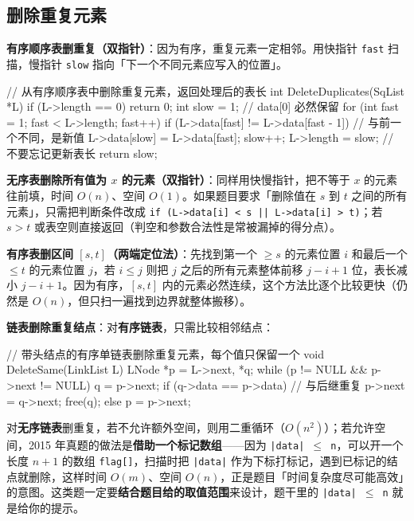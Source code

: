 \documentclass[11pt,openany,UTF8]{ctexbook}
\begin{document}
\subsection{删除重复元素}

\textbf{有序顺序表删重复（双指针）}：因为有序，重复元素一定相邻。用快指针 \texttt{fast} 扫描，慢指针 \texttt{slow} 指向「下一个不同元素应写入的位置」。

\begin{codebox}
// 从有序顺序表中删除重复元素，返回处理后的表长
int DeleteDuplicates(SqList *L) {
    if (L->length == 0) return 0;
    int slow = 1;                            // data[0] 必然保留
    for (int fast = 1; fast < L->length; fast++) {
        if (L->data[fast] != L->data[fast - 1]) {  // 与前一个不同，是新值
            L->data[slow] = L->data[fast];
            slow++;
        }
    }
    L->length = slow;                        // 不要忘记更新表长
    return slow;
}
\end{codebox}

\textbf{无序表删除所有值为 $x$ 的元素（双指针）}：同样用快慢指针，把不等于 $x$ 的元素往前填，时间 $O(n)$、空间 $O(1)$。如果题目要求「删除值在 $s$ 到 $t$ 之间的所有元素」，只需把判断条件改成 \texttt{if (L->\allowbreak{}data[i]\allowbreak{} <\allowbreak{} s || L->\allowbreak{}data[i]\allowbreak{} >\allowbreak{} t)\allowbreak{}}；若 $s > t$ 或表空则直接返回（判空和参数合法性是常被漏掉的得分点）。

\textbf{有序表删区间 $[s,t]$（两端定位法）}：先找到第一个 $\ge s$ 的元素位置 $i$ 和最后一个 $\le t$ 的元素位置 $j$，若 $i \le j$ 则把 $j$ 之后的所有元素整体前移 $j-i+1$ 位，表长减小 $j-i+1$。因为有序，$[s,t]$ 内的元素必然连续，这个方法比逐个比较更快（仍然是 $O(n)$，但只扫一遍找到边界就整体搬移）。

\textbf{链表删除重复结点}：对\textbf{有序链表}，只需比较相邻结点：

\begin{codebox}
// 带头结点的有序单链表删除重复元素，每个值只保留一个
void DeleteSame(LinkList L) {
    LNode *p = L->next, *q;
    while (p != NULL && p->next != NULL) {
        q = p->next;
        if (q->data == p->data) {   // 与后继重复
            p->next = q->next;
            free(q);
        } else {
            p = p->next;
        }
    }
}
\end{codebox}

对\textbf{无序链表}删重复，若不允许额外空间，则用二重循环（$O(n^2)$）；若允许空间，2015 年真题的做法是\textbf{借助一个标记数组}——因为 \texttt{|data| $\le$ n}，可以开一个长度 $n+1$ 的数组 \texttt{flag[]\allowbreak{}}，扫描时把 \texttt{|data|} 作为下标打标记，遇到已标记的结点就删除，这样时间 $O(m)$、空间 $O(n)$，正是题目「时间复杂度尽可能高效」的意图。这类题一定要\textbf{结合题目给的取值范围}来设计，题干里的 \texttt{|data| $\le$ n} 就是给你的提示。
\end{document}
